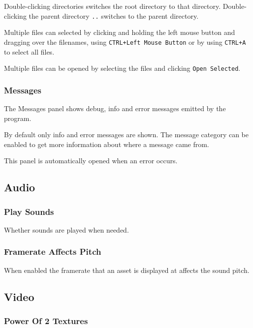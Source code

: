\documentclass[10pt, a4paper, titlepage, oneside]{article}
\newcommand{\code}[1]{\mbox{\texttt{#1}}}
\begin{document}
Double-clicking directories switches the root directory to that directory. Double-clicking the parent directory \code{..} switches to the parent directory.

\vspace{\baselineskip}
Multiple files can selected by clicking and holding the left mouse button and dragging over the filenames, using \code{CTRL+Left Mouse Button} or by using \code{CTRL+A} to select all files.

Multiple files can be opened by selecting the files and clicking \code{Open Selected}.

\subsubsection{Messages}

The Messages panel shows debug, info and error messages emitted by the program.

By default only info and error messages are shown. The message category can be enabled to get more information about where a message came from.

This panel is automatically opened when an error occurs.

\newpage

\subsection{Audio}

\subsubsection{Play Sounds}

Whether sounds are played when needed.

\subsubsection{Framerate Affects Pitch}

When enabled the framerate that an asset is displayed at affects the sound pitch.

\subsection{Video}

\subsubsection{Power Of 2 Textures}
\end{document}
